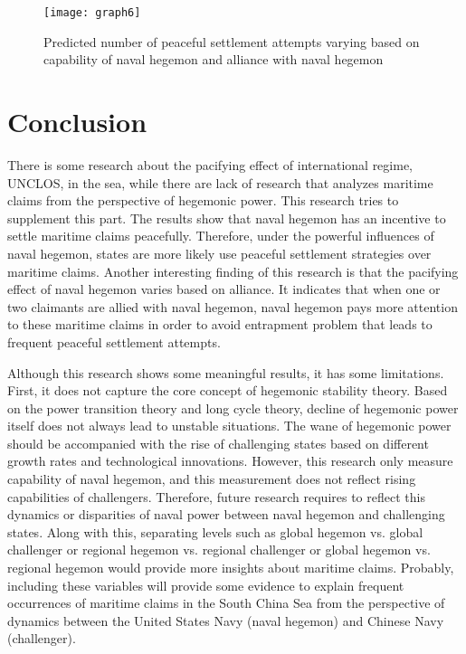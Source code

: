 \documentclass{article}
\begin{document}
\begin{figure}[h]
\centering
\texttt{[image: graph6]}
\caption{Predicted number of peaceful settlement attempts varying based on capability of naval hegemon and alliance with naval hegemon}
\end{figure}

\section*{Conclusion}
\hspace{0.5cm}There is some research about the pacifying effect of international regime, UNCLOS, in the sea, while there are lack of research that analyzes maritime claims from the perspective of hegemonic power. This research tries to supplement this part. The results show that naval hegemon has an incentive to settle maritime claims peacefully. Therefore, under the powerful influences of naval hegemon, states are more likely use peaceful settlement strategies over maritime claims. Another interesting finding of this research is that the pacifying effect of naval hegemon varies based on alliance. It indicates that when one or two claimants are allied with naval hegemon, naval hegemon pays more attention to these maritime claims in order to avoid entrapment problem that leads to frequent peaceful settlement attempts. 

Although this research shows some meaningful results, it has some limitations. First, it does not capture the core concept of hegemonic stability theory. Based on the power transition theory and long cycle theory, decline of hegemonic power itself does not always lead to unstable situations. The wane of hegemonic power should be accompanied with the rise of challenging states based on different growth rates and technological innovations. However, this research only measure capability of naval hegemon, and this measurement does not reflect rising capabilities of challengers. Therefore, future research requires to reflect this dynamics or disparities of naval power between naval hegemon and challenging states. Along with this, separating levels such as global hegemon vs. global challenger or regional hegemon vs. regional challenger or global hegemon vs. regional hegemon would provide more insights about maritime claims. Probably, including these variables will provide some evidence to explain frequent occurrences of maritime claims in the South China Sea from the perspective of dynamics between the United States Navy (naval hegemon) and Chinese Navy (challenger). 
\end{document}
